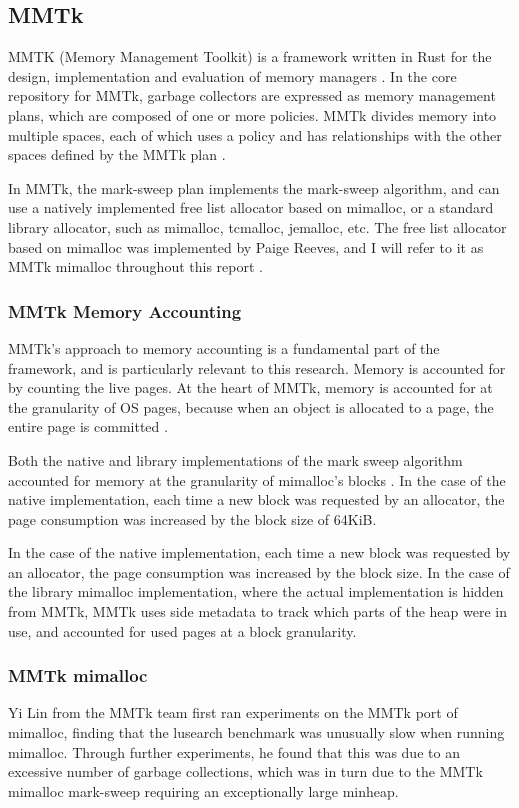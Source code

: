 \documentclass{article}
\begin{document}
\subsection{MMTk}
MMTK (Memory Management Toolkit) is a framework written in Rust for the design, implementation and evaluation of memory managers \cite{mmtk-core}. In the core repository for MMTk, garbage collectors are expressed as memory management plans, which are composed of one or more policies. MMTk divides memory into multiple spaces, each of which uses a policy and has relationships with the other spaces defined by the MMTk plan \cite{mmtk-core}.

In MMTk, the mark-sweep plan implements the mark-sweep algorithm, and can use a natively implemented free list allocator based on mimalloc, or a standard library allocator, such as mimalloc, tcmalloc, jemalloc, etc. The free list allocator based on mimalloc was implemented by Paige Reeves, and I will refer to it as MMTk mimalloc throughout this report \cite{pr643}.

\subsubsection{MMTk Memory Accounting}
MMTk's approach to memory accounting is a fundamental part of the framework, and is particularly relevant to this research. Memory is accounted for by counting the live pages. At the heart of MMTk, memory is accounted for at the granularity of OS pages, because when an object is allocated to a page, the entire page is committed \cite{mmtk-core}.

Both the native and library implementations of the mark sweep algorithm accounted for memory at the granularity of mimalloc's blocks \cite{mmtk-core,pr689}. In the case of the native implementation, each time a new block was requested by an allocator, the page consumption was increased by the block size of 64KiB.

In the case of the native implementation, each time a new block was requested by an allocator, the page consumption was increased by the block size. In the case of the library mimalloc implementation, where the actual implementation is hidden from MMTk, MMTk uses side metadata to track which parts of the heap were in use, and accounted for used pages at a block granularity.

\subsubsection{MMTk mimalloc}
Yi Lin from the MMTk team first ran experiments on the MMTk port of mimalloc, finding that the lusearch benchmark was unusually slow when running mimalloc. Through further experiments, he found that this was due to an excessive number of garbage collections, which was in turn due to the MMTk mimalloc mark-sweep requiring an exceptionally large minheap.
\end{document}
